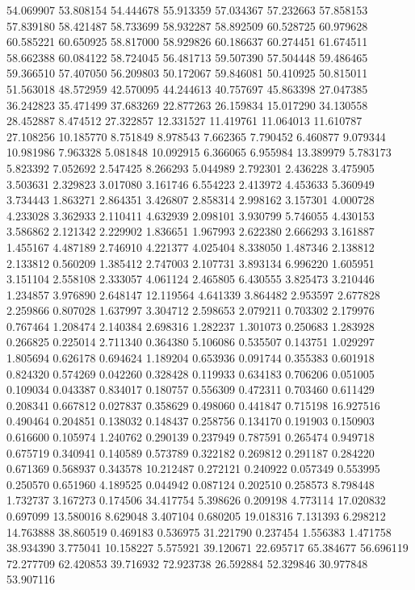 54.069907
53.808154
54.444678
55.913359
57.034367
57.232663
57.858153
57.839180
58.421487
58.733699
58.932287
58.892509
60.528725
60.979628
60.585221
60.650925
58.817000
58.929826
60.186637
60.274451
61.674511
58.662388
60.084122
58.724045
56.481713
59.507390
57.504448
59.486465
59.366510
57.407050
56.209803
50.172067
59.846081
50.410925
50.815011
51.563018
48.572959
42.570095
44.244613
40.757697
45.863398
27.047385
36.242823
35.471499
37.683269
22.877263
26.159834
15.017290
34.130558
28.452887
8.474512
27.322857
12.331527
11.419761
11.064013
11.610787
27.108256
10.185770
8.751849
8.978543
7.662365
7.790452
6.460877
9.079344
10.981986
7.963328
5.081848
10.092915
6.366065
6.955984
13.389979
5.783173
5.823392
7.052692
2.547425
8.266293
5.044989
2.792301
2.436228
3.475905
3.503631
2.329823
3.017080
3.161746
6.554223
2.413972
4.453633
5.360949
3.734443
1.863271
2.864351
3.426807
2.858314
2.998162
3.157301
4.000728
4.233028
3.362933
2.110411
4.632939
2.098101
3.930799
5.746055
4.430153
3.586862
2.121342
2.229902
1.836651
1.967993
2.622380
2.666293
3.161887
1.455167
4.487189
2.746910
4.221377
4.025404
8.338050
1.487346
2.138812
2.133812
0.560209
1.385412
2.747003
2.107731
3.893134
6.996220
1.605951
3.151104
2.558108
2.333057
4.061124
2.465805
6.430555
3.825473
3.210446
1.234857
3.976890
2.648147
12.119564
4.641339
3.864482
2.953597
2.677828
2.259866
0.807028
1.637997
3.304712
2.598653
2.079211
0.703302
2.179976
0.767464
1.208474
2.140384
2.698316
1.282237
1.301073
0.250683
1.283928
0.266825
0.225014
2.711340
0.364380
5.106086
0.535507
0.143751
1.029297
1.805694
0.626178
0.694624
1.189204
0.653936
0.091744
0.355383
0.601918
0.824320
0.574269
0.042260
0.328428
0.119933
0.634183
0.706206
0.051005
0.109034
0.043387
0.834017
0.180757
0.556309
0.472311
0.703460
0.611429
0.208341
0.667812
0.027837
0.358629
0.498060
0.441847
0.715198
16.927516
0.490464
0.204851
0.138032
0.148437
0.258756
0.134170
0.191903
0.150903
0.616600
0.105974
1.240762
0.290139
0.237949
0.787591
0.265474
0.949718
0.675719
0.340941
0.140589
0.573789
0.322182
0.269812
0.291187
0.284220
0.671369
0.568937
0.343578
10.212487
0.272121
0.240922
0.057349
0.553995
0.250570
0.651960
4.189525
0.044942
0.087124
0.202510
0.258573
8.798448
1.732737
3.167273
0.174506
34.417754
5.398626
0.209198
4.773114
17.020832
0.697099
13.580016
8.629048
3.407104
0.680205
19.018316
7.131393
6.298212
14.763888
38.860519
0.469183
0.536975
31.221790
0.237454
1.556383
1.471758
38.934390
3.775041
10.158227
5.575921
39.120671
22.695717
65.384677
56.696119
72.277709
62.420853
39.716932
72.923738
26.592884
52.329846
30.977848
53.907116
